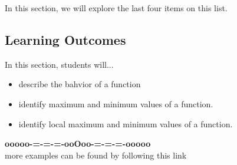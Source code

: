 \documentclass{ximera}
\begin{document}
In this section, we will explore the last four items on this list.







\subsection*{Learning Outcomes}

\begin{sectionOutcomes}
In this section, students will...

\begin{itemize}
\item describe the bahvior of a function
\item identify maximum and minimum values of a function.
\item identify local maximum and minimum values of a function.
\end{itemize}
\end{sectionOutcomes}
























\begin{onlineOnly}
\begin{center}
\textbf{\textcolor{green!50!black}{ooooo-=-=-=-ooOoo-=-=-=-ooooo}} \\

more examples can be found by following this link\\ 

\end{center}
\end{onlineOnly}
\end{document}
